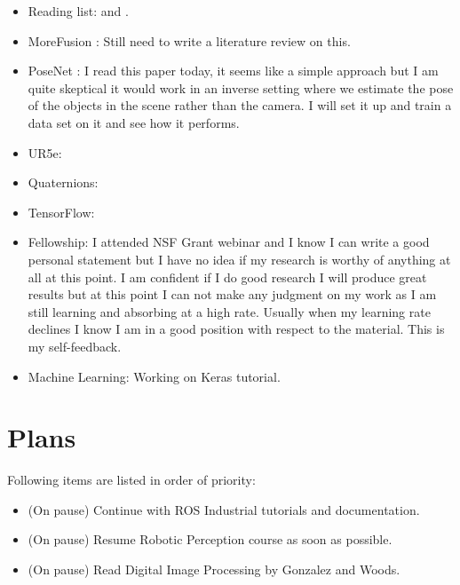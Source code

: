 \documentclass[11pt]{article}
\begin{document}
\begin{itemize}
	\item Reading list: \cite{lampinen2001bayesian} and \cite{li2019survey}.

	\item MoreFusion \cite{MoreFusion}: Still need to write a literature review on this.

	\item PoseNet \cite{PoseNet}: I read this paper today, it seems like a simple approach but I am quite skeptical it would work in an inverse setting where we estimate the pose of the objects in the scene rather than the camera. I will set it up and train a data set on it and see how it performs.

	\item UR5e:

	\item Quaternions:

	\item TensorFlow:

	\item Fellowship: I attended NSF Grant webinar and I know I can write a good personal statement but I have no idea if my research is worthy of anything at all at this point. I am confident if I do good research I will produce great results but at this point I can not make any judgment on my work as I am still learning and absorbing at a high rate. Usually when my learning rate declines I know I am in a good position with respect to the material. This is my self-feedback.

	\item Machine Learning: Working on Keras tutorial.




\end{itemize}

\newpage

\section{Plans}
Following items are listed in order of priority:

\begin{itemize}

	\item (On pause) Continue with ROS Industrial tutorials and documentation.

	\item (On pause) Resume Robotic Perception course as soon as possible.

	\item (On pause) Read Digital Image Processing by Gonzalez and Woods.

\end{itemize}



\newpage


\end{document}
